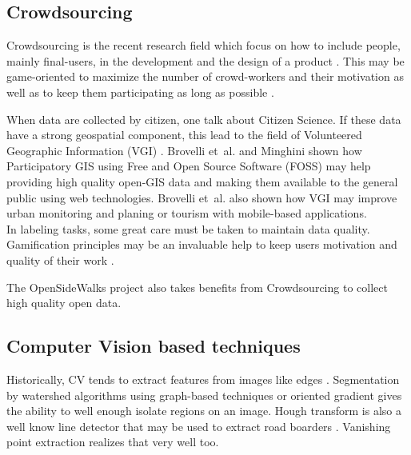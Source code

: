 \documentclass[10pt,conference,a4paper]{IEEEtran}
\begin{document}
\subsection{Crowdsourcing}
Crowdsourcing is the recent research field which focus on how to include people, mainly final-users, in the development and the design of a product \cite{ghezzi_crowdsourcing:_2017}. This may be game-oriented to maximize the number of crowd-workers and their motivation as well as to keep them participating as long as possible \cite{zeng_motivation_2017,morschheuser_gamified_2017}.

When data are collected by citizen, one talk about Citizen Science. If these data have a strong geospatial component, this lead to the field of Volunteered Geographic Information (VGI) \cite{sui_citizen_2013}. Brovelli et~al. \cite{brovelli_webbased_2014} and Minghini \cite{minghini_multi-dimensional_2014} shown how Participatory GIS using Free and Open Source Software (FOSS) may help providing high quality open-GIS data and making them available to the general public using web technologies. Brovelli et~al. \cite{brovelli_public_2016} also shown how VGI may improve urban monitoring and planing or tourism with mobile-based applications.\\


In labeling tasks, some great care must be taken to maintain data quality. Gamification principles may be an invaluable help to keep users motivation and quality of their work \cite{von_ahn_labeling_2004,von2006peekaboom}. 

The OpenSideWalks project also takes benefits from Crowdsourcing \cite{noauthor_opensidewalks_nodate,tanweer_mapping_2017} to collect high quality open data. %



\subsection{Computer Vision based techniques}
Historically, CV tends to extract features from images like edges \cite{canny_computational_1986}.
Segmentation by watershed algorithms \cite{beucher_road_1990,meyer_morphological_1990, beucher_segmentation:_1993} using graph-based techniques \cite{felzenszwalb_efficient_2004} or oriented gradient \cite{malisiewicz_ensemble_2011} gives the ability to well enough isolate regions on an image.
Hough transform is also a well know line detector that may be used to extract road boarders \cite{duda_use_1972,illingworth_survey_1988,ballard_generalizing_1981,kiryati_probabilistic_1991,yu1997,aly2008real}. Vanishing point extraction \cite{se_road_2003,wang2004lane,kong2009vanishing} realizes that very well too.
\end{document}
